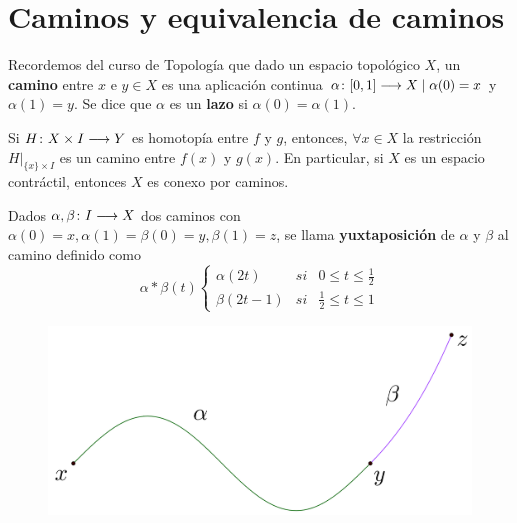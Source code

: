 \documentclass[GTS.tex]{subfiles}
\begin{document}
\section{Caminos y equivalencia de caminos}

Recordemos del curso de Topología que dado un espacio topológico $X$, un \textbf{camino} entre $x$ e $y\in X$ es una aplicación continua $\alpha\colon{[0,1]}\longrightarrow{X}\mid\alpha(0)=x$ y $\alpha(1)=y$. Se dice que $\alpha$ es un \textbf{lazo} si $\alpha(0)=\alpha(1)$.


\begin{ejer}[Importante] Si $H\colon{X\times I}\longrightarrow{Y}$ es homotopía entre $f$ y $g$, entonces, $\forall x\in X$ la restricción $H\big|_{\{x\}\times I}$ es un camino entre $f(x)$ y $g(x)$. En particular, si $X$ es un espacio contráctil, entonces $X$ es conexo por caminos.
\end{ejer}

\begin{defi} Dados $\alpha,\beta\colon{I}\longrightarrow{X}$ dos caminos con $\alpha(0)=x,\alpha(1)=\beta(0)=y,\beta(1)=z$, se llama \textbf{yuxtaposición} de $\alpha$ y $\beta$ al camino definido como
\begin{equation*}
\alpha*\beta(t)\left\{\begin{array}{lcc}
\alpha(2t) & si & 0\leq t\leq\frac{1}{2}\\
\beta(2t-1) & si & \frac{1}{2}\leq t\leq 1

\end{array}\right.
\end{equation*}
\end{defi}
\begin{figure}[h!]
	\centering
	\includegraphics[scale=0.]{yux}
\end{figure}
\end{document}

